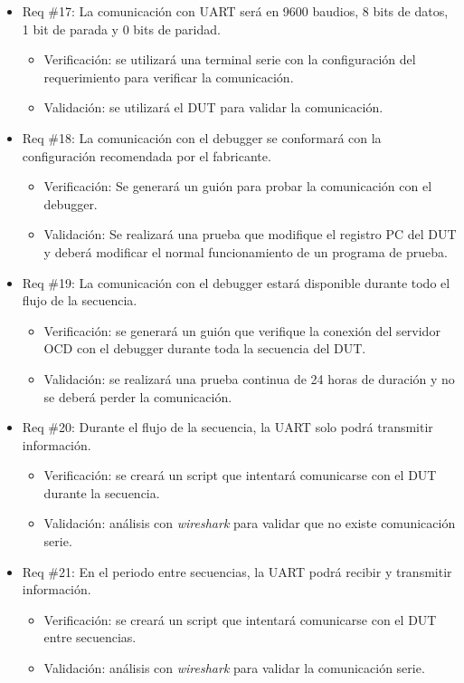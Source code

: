 \documentclass[
11pt, %
]{charter}
\begin{document}
\begin{itemize}
\item Req \#17: La comunicación con UART será en 9600 baudios, 8 bits de datos, 1 bit de parada y 0 bits de paridad.
\begin{itemize}
    \item Verificación: se utilizará una terminal serie con la configuración del requerimiento para verificar la comunicación.
    \item Validación: se utilizará el DUT para validar la comunicación.
\end{itemize}

\item Req \#18: La comunicación con el debugger se conformará con la configuración recomendada por el fabricante.
\begin{itemize}
    \item Verificación: Se generará un guión para probar la comunicación con el debugger.
    \item Validación: Se realizará una prueba que modifique el registro PC del DUT y deberá modificar el normal funcionamiento de un programa de prueba.
\end{itemize}

\item Req \#19: La comunicación con el debugger estará disponible durante todo el flujo de la secuencia.
\begin{itemize}
    \item Verificación: se generará un guión que verifique la conexión del servidor OCD con el debugger durante toda la secuencia del DUT.
    \item Validación: se realizará una prueba continua de 24 horas de duración y no se deberá perder la comunicación.
\end{itemize}

\item Req \#20: Durante el flujo de la secuencia, la UART solo podrá transmitir información.
\begin{itemize}
    \item Verificación: se creará un script que intentará comunicarse con el DUT durante la secuencia.
    \item Validación: análisis con \emph{wireshark} para validar que no existe comunicación serie.
\end{itemize}

\item Req \#21: En el periodo entre secuencias, la UART podrá recibir y transmitir información.
\begin{itemize}
    \item Verificación: se creará un script que intentará comunicarse con el DUT entre secuencias.
    \item Validación: análisis con \emph{wireshark} para validar la comunicación serie.
\end{itemize}


\end{itemize}
\end{document}

